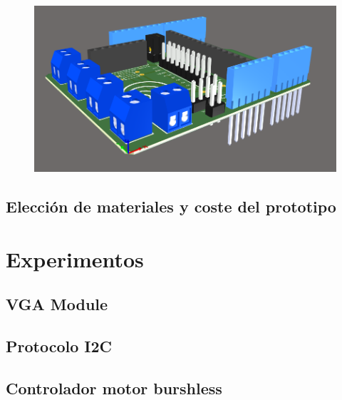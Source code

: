 \begin{center}
	\begin{figure}[H]
		\center
		\includegraphics[scale=0.8]{imagenes/Balancing_Robot/Vista3D2.PNG}
		\caption{}
		\label{fig:Vista3D2}
	\end{figure}
\end{center}

\subsection{Elección de materiales y coste del prototipo}


\section{Experimentos}
\subsection{VGA Module}
\subsection{Protocolo I2C}
\subsection{Controlador motor burshless}